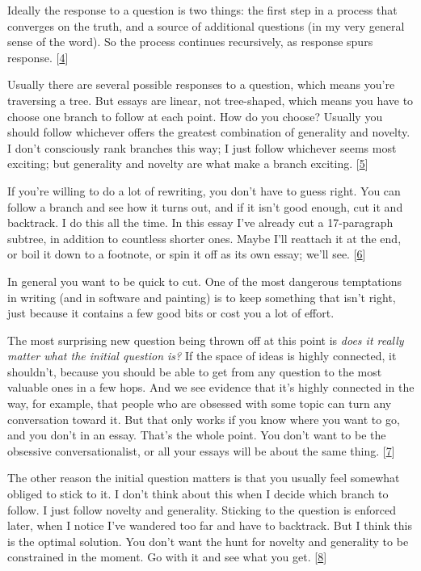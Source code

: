 Ideally the response to a question is two things: the first step in a
process that converges on the truth, and a source of additional
questions (in my very general sense of the word). So the process
continues recursively, as response spurs response.
{[}\hyperref[f4n]{4}{]}

Usually there are several possible responses to a question, which means
you're traversing a tree. But essays are linear, not tree-shaped, which
means you have to choose one branch to follow at each point. How do you
choose? Usually you should follow whichever offers the greatest
combination of generality and novelty. I don't consciously rank branches
this way; I just follow whichever seems most exciting; but generality
and novelty are what make a branch exciting. {[}\hyperref[f5n]{5}{]}

If you're willing to do a lot of rewriting, you don't have to guess
right. You can follow a branch and see how it turns out, and if it isn't
good enough, cut it and backtrack. I do this all the time. In this essay
I've already cut a 17-paragraph subtree, in addition to countless
shorter ones. Maybe I'll reattach it at the end, or boil it down to a
footnote, or spin it off as its own essay; we'll see.
{[}\hyperref[f6n]{6}{]}

In general you want to be quick to cut. One of the most dangerous
temptations in writing (and in software and painting) is to keep
something that isn't right, just because it contains a few good bits or
cost you a lot of effort.

The most surprising new question being thrown off at this point is
\emph{does it really matter what the initial question is?} If the space
of ideas is highly connected, it shouldn't, because you should be able
to get from any question to the most valuable ones in a few hops. And we
see evidence that it's highly connected in the way, for example, that
people who are obsessed with some topic can turn any conversation toward
it. But that only works if you know where you want to go, and you don't
in an essay. That's the whole point. You don't want to be the obsessive
conversationalist, or all your essays will be about the same thing.
{[}\hyperref[f7n]{7}{]}

The other reason the initial question matters is that you usually feel
somewhat obliged to stick to it. I don't think about this when I decide
which branch to follow. I just follow novelty and generality. Sticking
to the question is enforced later, when I notice I've wandered too far
and have to backtrack. But I think this is the optimal solution. You
don't want the hunt for novelty and generality to be constrained in the
moment. Go with it and see what you get. {[}\hyperref[f8n]{8}{]}

